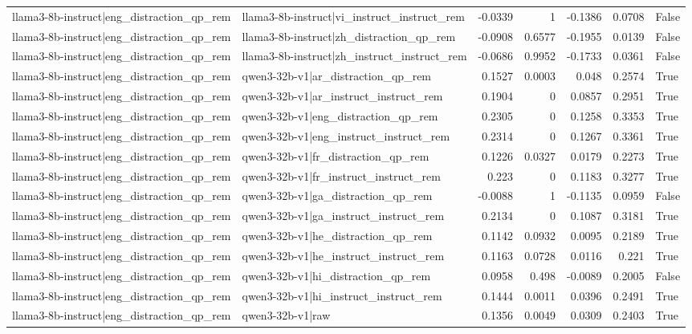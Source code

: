 \begin{table}
\begin{tabular}{l l r r r r l}
llama3-8b-instruct|eng_distraction_qp_rem & llama3-8b-instruct|vi_instruct_instruct_rem & -0.0339 & 1 & -0.1386 & 0.0708 & False \\
llama3-8b-instruct|eng_distraction_qp_rem & llama3-8b-instruct|zh_distraction_qp_rem & -0.0908 & 0.6577 & -0.1955 & 0.0139 & False \\
llama3-8b-instruct|eng_distraction_qp_rem & llama3-8b-instruct|zh_instruct_instruct_rem & -0.0686 & 0.9952 & -0.1733 & 0.0361 & False \\
llama3-8b-instruct|eng_distraction_qp_rem & qwen3-32b-v1|ar_distraction_qp_rem & 0.1527 & 0.0003 & 0.048 & 0.2574 & True \\
llama3-8b-instruct|eng_distraction_qp_rem & qwen3-32b-v1|ar_instruct_instruct_rem & 0.1904 & 0 & 0.0857 & 0.2951 & True \\
llama3-8b-instruct|eng_distraction_qp_rem & qwen3-32b-v1|eng_distraction_qp_rem & 0.2305 & 0 & 0.1258 & 0.3353 & True \\
llama3-8b-instruct|eng_distraction_qp_rem & qwen3-32b-v1|eng_instruct_instruct_rem & 0.2314 & 0 & 0.1267 & 0.3361 & True \\
llama3-8b-instruct|eng_distraction_qp_rem & qwen3-32b-v1|fr_distraction_qp_rem & 0.1226 & 0.0327 & 0.0179 & 0.2273 & True \\
llama3-8b-instruct|eng_distraction_qp_rem & qwen3-32b-v1|fr_instruct_instruct_rem & 0.223 & 0 & 0.1183 & 0.3277 & True \\
llama3-8b-instruct|eng_distraction_qp_rem & qwen3-32b-v1|ga_distraction_qp_rem & -0.0088 & 1 & -0.1135 & 0.0959 & False \\
llama3-8b-instruct|eng_distraction_qp_rem & qwen3-32b-v1|ga_instruct_instruct_rem & 0.2134 & 0 & 0.1087 & 0.3181 & True \\
llama3-8b-instruct|eng_distraction_qp_rem & qwen3-32b-v1|he_distraction_qp_rem & 0.1142 & 0.0932 & 0.0095 & 0.2189 & True \\
llama3-8b-instruct|eng_distraction_qp_rem & qwen3-32b-v1|he_instruct_instruct_rem & 0.1163 & 0.0728 & 0.0116 & 0.221 & True \\
llama3-8b-instruct|eng_distraction_qp_rem & qwen3-32b-v1|hi_distraction_qp_rem & 0.0958 & 0.498 & -0.0089 & 0.2005 & False \\
llama3-8b-instruct|eng_distraction_qp_rem & qwen3-32b-v1|hi_instruct_instruct_rem & 0.1444 & 0.0011 & 0.0396 & 0.2491 & True \\
llama3-8b-instruct|eng_distraction_qp_rem & qwen3-32b-v1|raw & 0.1356 & 0.0049 & 0.0309 & 0.2403 & True \\

\end{tabular}
\end{table}
